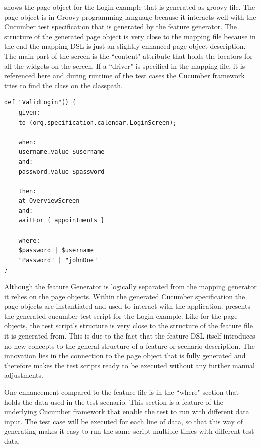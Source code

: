 \documentclass{sig-alternate-05-2015}
\begin{document}
 shows the page object for the Login example that is generated as groovy file.
The page object is in Groovy programming language because it interacts well with the Cucumber test specification that is generated by the feature generator.
The structure of the generated page object is very close to the mapping file because in the end the mapping DSL is just an slightly enhanced page object description.
The main part of the screen is the ``content" attribute that holds the locators for all the widgets on the screen.
If a ``driver" is specified in the mapping file, it is referenced here and during runtime of the test cases the Cucumber framework tries to find the class on the classpath.

\begin{lstlisting}[captionpos=b, caption=Generated Feature File, label={lst:featureGenerated}, language=dsl]
	def "ValidLogin"() {
	given:
	to (org.specification.calendar.LoginScreen);
	
	when:
	username.value $username
	and:
	password.value $password
	
	then:
	at OverviewScreen
	and:
	waitFor { appointments }
	
	where:
	$password | $username
	"Password" | "johnDoe"
}
\end{lstlisting}

Although the feature Generator is logically separated from the mapping generator it relies on the page objects.
Within the generated Cucumber specification the page objects are instantiated and used to interact with the application.
 presents the generated cucumber test script for the Login example. 
Like for the page objects, the test script's structure is very close to the structure of the feature file it is generated from.
This is due to the fact that the feature DSL itself introduces no new concepts to the general structure of a feature or scenario description.
The innovation lies in the connection to the page object that is fully generated and therefore makes the test scripts ready to be executed without any further manual adjustments.

One enhancement compared to the feature file is in the ``where" section that holds the data used in the test scenario.
This section is a feature of the underlying Cucumber framework that enable the test to run with different data input. 
The test case will be executed for each line of data, so that this way of generating makes it easy to run the same script multiple times with different test data.
\end{document}
